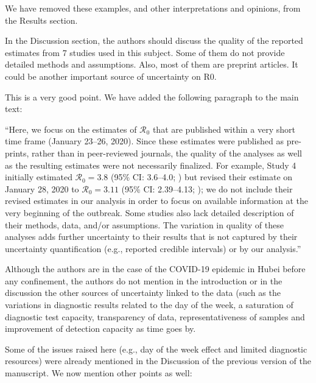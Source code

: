 \documentclass[12pt]{article}
\newcommand{\Ro}{\ensuremath{{\mathcal R}_{0}}\xspace}
\newcommand{\revtext}{\textsf}
\begin{document}
We have removed these examples, and other interpretations and opinions, from the Results section.

\revtext{In the Discussion section, the authors should discuss the quality of the reported estimates from
7 studies used in this subject. Some of them do not provide detailed methods and assumptions.
Also, most of them are preprint articles. It could be another important source of uncertainty on
R0.}

This is a very good point. We have added the following paragraph to the main text:

``Here, we focus on the estimates of \Ro that are published within a very short time frame (January 23--26, 2020).
Since these estimates were published as pre-prints, rather than in peer-reviewed journals, the quality of the analyses as well as the resulting estimates were not necessarily finalized.
For example, Study 4 initially estimated $\Ro = 3.8$ (95\% CI: 3.6--4.0; \cite{readncov}) but revised their estimate on January 28, 2020 to $\Ro = 3.11$ (95\% CI: 2.39--4.13; \cite{readncov2});
we do not include their revised estimates in our analysis in order to focus on available information at the very beginning of the outbreak.
Some studies also lack detailed description of their methods, data, and/or assumptions.
The variation in quality of these analyses adds further uncertainty to their results that is not captured by their uncertainty quantification (e.g., reported credible intervals) or by our analysis.''

\revtext{Although the authors are in the case of the COVID-19 epidemic in Hubei before any
confinement, the authors do not mention in the introduction or in the discussion the other
sources of uncertainty linked to the data (such as the variations in diagnostic results related to
the day of the week, a saturation of diagnostic test capacity, transparency of data,
representativeness of samples and improvement of detection capacity as time goes by.}

Some of the issues raised here (e.g., day of the week effect and limited diagnostic resources) were already mentioned in the Discussion of the previous version of the manuscript. We now mention other points as well:
\end{document}
